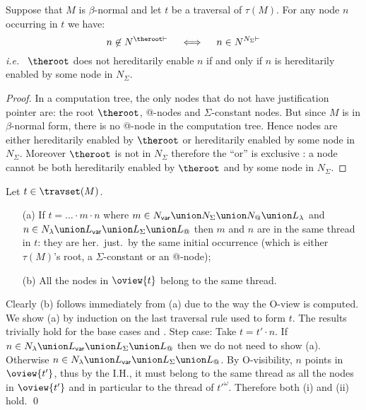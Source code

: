 \begin{lemma}
\label{lem:betanorm_enabling}
Suppose that $M$ is $\beta$-normal and let $t$ be a traversal of $\tau(M)$.
For any node $n$ occurring in $t$ we have:
$$ n \not\in N^{\theroot\vdash} \quad \iff \quad n \in N^{N_{\Sigma}\vdash}$$
{\it i.e.}~ $\theroot$ does not hereditarily enable $n$ if and only if $n$ is
hereditarily enabled by some node in $N_\Sigma$.
\end{lemma}
\begin{proof}
 In a computation tree, the only nodes that do not have justification pointer are:
the root $\theroot$, @-nodes and $\Sigma$-constant nodes. But since $M$ is
in $\beta$-normal form, there is no @-node in the computation tree.
Hence nodes are either hereditarily enabled by $\theroot$ or hereditarily
enabled by some node in $N_\Sigma$. Moreover $\theroot$ is not in $N_\Sigma$
therefore the ``or'' is exclusive : a node cannot be both hereditarily
enabled by $\theroot$ and by some node in $N_\Sigma$.
\end{proof}


\begin{lemma}
\label{lem:trav_oview_single_threaded}
Let $t \in \travset(M)$.
\begin{itemize}
\item[(a)] If $t= \ldots \cdot m \cdot n$ where
$m\in N_{\sf var} \union N_\Sigma \union N_@ \union
L_\lambda$ and $n\in N_\lambda \union L_{\sf var}
\union L_\Sigma \union L_@$ then
$m$ and $n$ are in the same thread in $t$: they are her.\ just.\ by the same initial occurrence (which is either $\tau(M)$'s root, a $\Sigma$-constant or an @-node);

\item[(b)] All the nodes in $\oview{t}$ belong to the same thread.
\end{itemize}
\end{lemma}
\proof
Clearly (b) follows immediately from (a) due to the way the O-view is computed. We show (a) by induction on the last traversal rule used to form $t$. The results trivially hold for the base cases  and .
Step case: Take $t = t' \cdot n$. If $n \in N_\lambda\union L_{\sf var} \union L_\Sigma \union L_@$ then we do not need to show (a).
Otherwise $n \in  N_\lambda \union L_{\sf var} \union L_\Sigma \union L_@$. By O-visibility, $n$ points in $\oview{t'}$, thus by the I.H., it must belong to the same thread as all the nodes in $\oview{t'}$ and in particular to the thread of $t'^\omega$. Therefore both (i) and (ii) hold.
\qed


